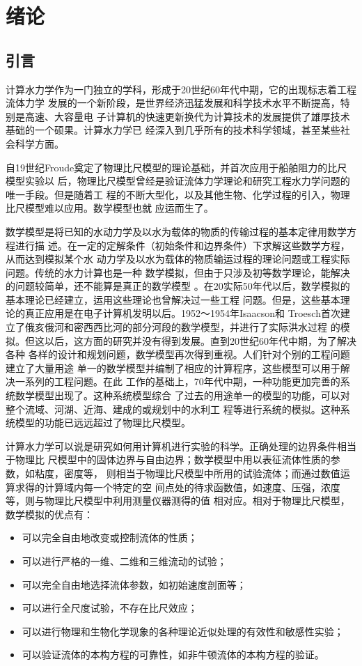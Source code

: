 \chapter{绪论}
\section{引言}
计算水力学作为一门独立的学科，形成于20世纪60年代中期，它的出现标志着工程流体力学
发展的一个新阶段，是世界经济迅猛发展和科学技术水平不断提高，特别是高速、大容量电
子计算机的快速更新换代为计算技术的发展提供了雄厚技术基础的一个硕果。计算水力学已
经深入到几乎所有的技术科学领域，甚至某些社会科学方面。

自19世纪Froude奠定了物理比尺模型的理论基础，并首次应用于船舶阻力的比尺模型实验以
后，物理比尺模型曾经是验证流体力学理论和研究工程水力学问题的唯一手段。但是随着工
程的不断大型化，以及其他生物、化学过程的引入，物理比尺模型难以应用。数学模型也就
应运而生了。

数学模型是将已知的水动力学及以水为载体的物质的传输过程的基本定律用数学方程进行描
述。在一定的定解条件（初始条件和边界条件）下求解这些数学方程，从而达到模拟某个水
动力学及以水为载体的物质输运过程的理论问题或工程实际问题。传统的水力计算也是一种
数学模拟，但由于只涉及初等数学理论，能解决的问题较简单，还不能算是真正的数学模型
。在20实际50年代以后，数学模拟的基本理论已经建立，运用这些理论也曾解决过一些工程
问题。但是，这些基本理论的真正应用是在电子计算机发明以后。1952～1954年Isaacson和
Troesch首次建立了俄亥俄河和密西西比河的部分河段的数学模型，并进行了实际洪水过程
的模拟。但这以后，这方面的研究并没有得到发展。直到20世纪60年代中期，为了解决各种
各样的设计和规划问题，数学模型再次得到重视。人们针对个别的工程问题建立了大量用途
单一的数学模型并编制了相应的计算程序，这些模型可以用于解决一系列的工程问题。在此
工作的基础上，70年代中期，一种功能更加完善的系统数学模型出现了。这种系统模型综合
了过去的用途单一的模型的功能，可以对整个流域、河湖、近海、建成的或规划中的水利工
程等进行系统的模拟。这种系统模型的功能已远远超过了物理比尺模型。

计算水力学可以说是研究如何用计算机进行实验的科学。正确处理的边界条件相当于物理比
尺模型中的固体边界与自由边界；数学模型中用以表征流体性质的参数，如粘度，密度等，
则相当于物理比尺模型中所用的试验流体；而通过数值运算求得的计算域内每一个特定的空
间点处的待求函数值，如速度、压强，浓度等，则与物理比尺模型中利用测量仪器测得的值
相对应。相对于物理比尺模型，数学模拟的优点有：
\begin{itemize}
  \item 可以完全自由地改变或控制流体的性质；
  \item 可以进行严格的一维、二维和三维流动的试验；
  \item 可以完全自由地选择流体参数，如初始速度剖面等；
  \item 可以进行全尺度试验，不存在比尺效应；
  \item 可以进行物理和生物化学现象的各种理论近似处理的有效性和敏感性实验；
  \item 可以验证流体的本构方程的可靠性，如非牛顿流体的本构方程的验证。
\end{itemize}

